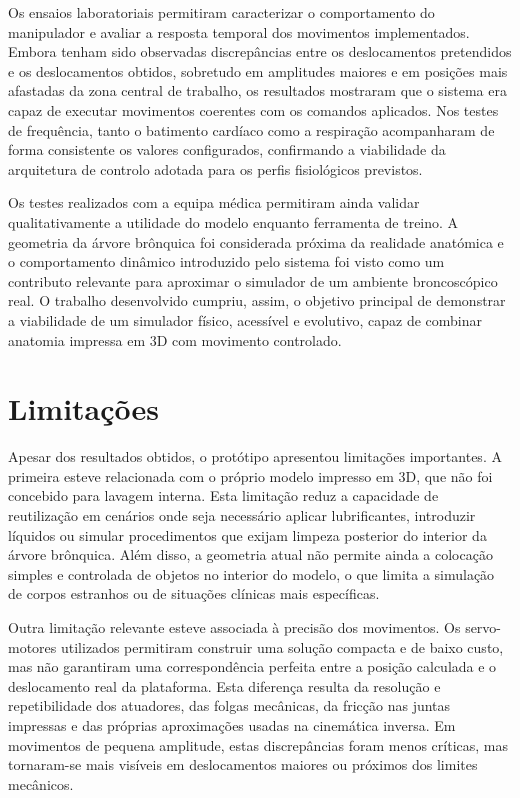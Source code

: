 Os ensaios laboratoriais permitiram caracterizar o comportamento do manipulador e avaliar a resposta temporal dos movimentos implementados. Embora tenham sido observadas discrepâncias entre os deslocamentos pretendidos e os deslocamentos obtidos, sobretudo em amplitudes maiores e em posições mais afastadas da zona central de trabalho, os resultados mostraram que o sistema era capaz de executar movimentos coerentes com os comandos aplicados. Nos testes de frequência, tanto o batimento cardíaco como a respiração acompanharam de forma consistente os valores configurados, confirmando a viabilidade da arquitetura de controlo adotada para os perfis fisiológicos previstos.

Os testes realizados com a equipa médica permitiram ainda validar qualitativamente a utilidade do modelo enquanto ferramenta de treino. A geometria da árvore brônquica foi considerada próxima da realidade anatómica e o comportamento dinâmico introduzido pelo sistema foi visto como um contributo relevante para aproximar o simulador de um ambiente broncoscópico real. O trabalho desenvolvido cumpriu, assim, o objetivo principal de demonstrar a viabilidade de um simulador físico, acessível e evolutivo, capaz de combinar anatomia impressa em 3D com movimento controlado.

\section{Limitações}
Apesar dos resultados obtidos, o protótipo apresentou limitações importantes. A primeira esteve relacionada com o próprio modelo impresso em 3D, que não foi concebido para lavagem interna. Esta limitação reduz a capacidade de reutilização em cenários onde seja necessário aplicar lubrificantes, introduzir líquidos ou simular procedimentos que exijam limpeza posterior do interior da árvore brônquica. Além disso, a geometria atual não permite ainda a colocação simples e controlada de objetos no interior do modelo, o que limita a simulação de corpos estranhos ou de situações clínicas mais específicas.

Outra limitação relevante esteve associada à precisão dos movimentos. Os servo-motores utilizados permitiram construir uma solução compacta e de baixo custo, mas não garantiram uma correspondência perfeita entre a posição calculada e o deslocamento real da plataforma. Esta diferença resulta da resolução e repetibilidade dos atuadores, das folgas mecânicas, da fricção nas juntas impressas e das próprias aproximações usadas na cinemática inversa. Em movimentos de pequena amplitude, estas discrepâncias foram menos críticas, mas tornaram-se mais visíveis em deslocamentos maiores ou próximos dos limites mecânicos.

